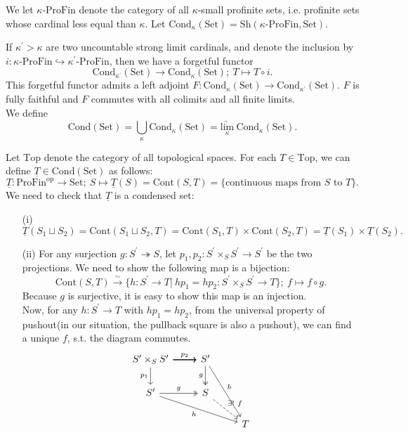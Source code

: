 \documentclass[UTF8,12,a4paper]{ctexart}
\theoremstyle{definition}
\begin{document}
\ntt 
We let $\kappa\text{-ProFin}$ denote the category of all $\kappa$-small profinite sets, i.e. profinite sets whose cardinal less equal than $\kappa$. Let  $\text{Cond}_\kappa(\text{Set})=\text{Sh}(\kappa\text{-ProFin},\text{Set})$.

\rem 
If $\kappa^\prime>\kappa$ are two uncountable strong limit cardinals, and denote the inclusion by $i:\kappa\text{-ProFin}\hookrightarrow \kappa^\prime\text{-ProFin} $, then we have a forgetful functor
$$
\text{Cond}_{\kappa^\prime}(\text{Set})\longrightarrow \text{Cond}_\kappa(\text{Set});\ T\mapsto T\circ i.
$$
This forgetful functor admits a left adjoint $F:\text{Cond}_{\kappa}(\text{Set})\longrightarrow \text{Cond}_{\kappa^\prime}(\text{Set})$. $F$ is fully faithful and $F$ commutes with all colimits and all finite limits.\\
We define 
$$
\text{Cond}(\text{Set})=\bigcup_\kappa \text{Cond}_{\kappa}(\text{Set})=\underset{\kappa}{\underrightarrow{\text{lim}}}\  \text{Cond}_{\kappa}(\text{Set}).
$$

\exm 
Let $\text{Top}$ denote the category of all topological spaces. For each $T\in \text{Top}$, we can define $\underline{T}\in \text{Cond}(\text{Set})$ as follows:
$$
\underline{T}:\text{ProFin}^{\text{op}}\longrightarrow\text{Set};\ S\mapsto \underline{T}(S)=\text{Cont}(S,T)=\{\text{continuous maps from } S\text{ to } T\}.
$$
We need to check that $\underline{T}$ is a condensed set:
\begin{itemize}
	\item [(i)] $\underline{T}(S_1\sqcup S_2)=\text{Cont}(S_1\sqcup S_2, T)=\text{Cont}(S_1, T)\times \text{Cont}(S_2, T)=\underline{T}(S_1)\times\underline{T}(S_2).$
	\item [(ii)] For any surjection $g:S^\prime\twoheadrightarrow S$, let $p_1,p_2:S^\prime\times_{S} S^\prime\rightarrow S^\prime$ be the two projections. We need to show the following map is a bijection:
	$$
	\text{Cont}(S,T)\stackrel{\sim}{\longrightarrow}\{h:S^\prime\rightarrow T|\ hp_1=hp_2: S^\prime\times_{S} S^\prime\rightarrow T\};\  f\mapsto f\circ g. 
	$$
	Because $g$ is surjective, it is easy to show this map is an injection.\\
	Now, for any $h:S^\prime\rightarrow T$ with $hp_1=hp_2$, from the universal property of pushout(in our situation, the pullback square is also a pushout), we can find a unique $f$, s.t. the diagram commutes.
	\begin{equation*}	
	\begin{tikzcd}
	S^\prime\times_{S} S^\prime \arrow[r] \arrow[r] \arrow[r] \arrow[r, "p_2"] \arrow[d, "p_1"'] & S^\prime \arrow[d, "g"', two heads] \arrow[rdd, "h"] &   \\
	S^\prime \arrow[r, "g", two heads] \arrow[rrd, "h"']                                         & S \arrow[rd, "\exists!\ f", dashed]                   &   \\
	&                                                      & T
	\end{tikzcd}
	\end{equation*}
\end{itemize}
\end{document}
